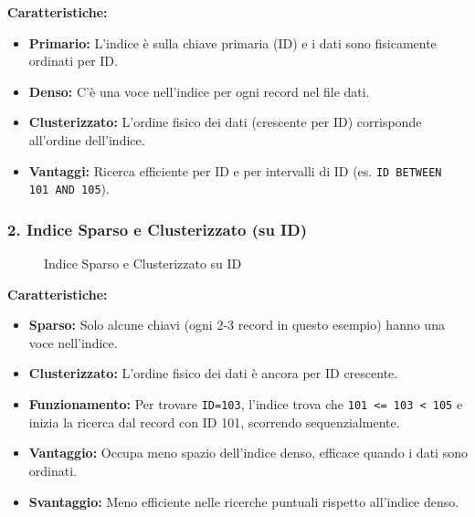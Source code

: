 \textbf{Caratteristiche:}
\begin{itemize}
    \item \textbf{Primario:} L'indice è sulla chiave primaria (ID) e i dati sono fisicamente ordinati per ID.
    \item \textbf{Denso:} C'è una voce nell'indice per ogni record nel file dati.
    \item \textbf{Clusterizzato:} L'ordine fisico dei dati (crescente per ID) corrisponde all'ordine dell'indice.
    \item \textbf{Vantaggi:} Ricerca efficiente per ID e per intervalli di ID (es. \texttt{ID BETWEEN 101 AND 105}).
\end{itemize}

\subsubsection{2. Indice Sparso e Clusterizzato (su ID)}

\begin{figure}[H]
\centering
{}
\caption{Indice Sparso e Clusterizzato su ID}
\end{figure}

\textbf{Caratteristiche:}
\begin{itemize}
    \item \textbf{Sparso:} Solo alcune chiavi (ogni 2-3 record in questo esempio) hanno una voce nell'indice.
    \item \textbf{Clusterizzato:} L'ordine fisico dei dati è ancora per ID crescente.
    \item \textbf{Funzionamento:} Per trovare \texttt{ID=103}, l'indice trova che \texttt{101 <= 103 < 105} e inizia la ricerca dal record con ID 101, scorrendo sequenzialmente.
    \item \textbf{Vantaggio:} Occupa meno spazio dell'indice denso, efficace quando i dati sono ordinati.
    \item \textbf{Svantaggio:} Meno efficiente nelle ricerche puntuali rispetto all'indice denso.
\end{itemize}

